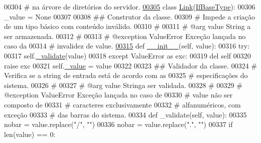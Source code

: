 \begin{DoxyCode}
00304 \textcolor{comment}{#   na árvore de diretórios do servidor.}
\hypertarget{BaseUnit_8py_source_l00305}{}\hyperlink{classELO_1_1BaseUnit_1_1Link}{00305} \textcolor{keyword}{class }\hyperlink{classELO_1_1BaseUnit_1_1Link}{Link}(\hyperlink{classELO_1_1BaseUnit_1_1IfBaseType}{IfBaseType}):
00306     \_value = \textcolor{keywordtype}{None}
00307 
00308     \textcolor{comment}{## Construtor da classe.}
00309     \textcolor{comment}{#   Impede a criação de um tipo básico com conteúdo inválido.}
00310     \textcolor{comment}{#}
00311     \textcolor{comment}{#   @arg        value       String a ser armazenada.}
00312     \textcolor{comment}{#}
00313     \textcolor{comment}{#   @exception  ValueError  Exceção lançada no caso da}
00314     \textcolor{comment}{#                           invalidez de value.}
\hypertarget{BaseUnit_8py_source_l00315}{}\hyperlink{classELO_1_1BaseUnit_1_1Link_a5351bce524252fdd1288bea6821756db}{00315}     \textcolor{keyword}{def }\hyperlink{classELO_1_1BaseUnit_1_1Link_a5351bce524252fdd1288bea6821756db}{\_\_init\_\_}(self, value):
00316         \textcolor{keywordflow}{try}:
00317             self.\hyperlink{classELO_1_1BaseUnit_1_1IfBaseType_acf84c5906a39b605a23ab68c4ca1dd19}{\_validate}(value)
00318         \textcolor{keywordflow}{except} ValueError \textcolor{keyword}{as} exc:
00319             del self
00320             \textcolor{keywordflow}{raise} exc
00321         self.\hyperlink{classELO_1_1BaseUnit_1_1IfBaseType_ad05d9d377fc4b99743c022cc8f6019d7}{\_value} = value
00322 
00323     \textcolor{comment}{## Validador da classe.}
00324     \textcolor{comment}{#   Verifica se a string de entrada está de acordo com as}
00325     \textcolor{comment}{#   especificações do sistema.}
00326     \textcolor{comment}{#}
00327     \textcolor{comment}{#   @arg        value       Stringa  ser validada.}
00328     \textcolor{comment}{#   }
00329     \textcolor{comment}{#   @exception  ValueError  Exceção lançada no caso de}
00330     \textcolor{comment}{#                           value não ser composto de}
00331     \textcolor{comment}{#                           caracteres exclusivamente}
00332     \textcolor{comment}{#                           alfanuméricos, com exceção}
00333     \textcolor{comment}{#                           das barras do sistema.}
00334     \textcolor{keyword}{def }\_validate(self, value):
00335         nobar = value.replace(\textcolor{stringliteral}{"/"}, \textcolor{stringliteral}{""})
00336         nobar = value.replace(\textcolor{stringliteral}{"."}, \textcolor{stringliteral}{""})
00337         \textcolor{keywordflow}{if} len(value) == 0:

\end{DoxyCode}

